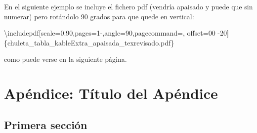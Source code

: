 \documentclass[12pt,a4paper,oneside,]{article}
\def\ifdoblecara{} %
\let\ifdoblecara\undefined %
\def\ifprincipal{} %
\newenvironment{Shaded}{\begin{snugshade}}{\end{snugshade}}
\newcommand{\FunctionTok}[1]{\textcolor[rgb]{0.00,0.00,0.00}{#1}}
\newcommand{\NormalTok}[1]{#1}
\numberwithin{dummy}{section}
\theoremstyle{ocrenumbox}
\theoremstyle{blacknumex}
\theoremstyle{blacknumbox}
\theoremstyle{ocrenum}
\theoremstyle{ocrenum}
\begin{document}
En el siguiente ejemplo se incluye el fichero pdf (vendría apaisado y
puede que sin numerar) pero rotándolo 90 grados para que quede en
vertical:

\begin{Shaded}
\begin{Highlighting}[]
\FunctionTok{\textbackslash{}includepdf}\NormalTok{[scale=0.90,pages=1{-},angle=90,pagecommand=,}
\NormalTok{offset=00 {-}20]\{chuleta\_tabla\_kableExtra\_apaisada\_texrevisado.pdf\}}
\end{Highlighting}
\end{Shaded}

como puede verse en la siguiente página.



\FloatBarrier

\appendix

\ifdefined\ifprincipal
\else
\setlength{\parindent}{1em}
\pagestyle{fancy}
\setcounter{tocdepth}{4}
\tableofcontents

\nocite{Luque2017,Luque2019,RStudio,R-base2,
R-knitr,R-rmarkdown,R-dplyr,R-ggplot2,Techopedia}

\fi

\ifdefined\ifdoblecara
\fancyhead{}{}
\fancyhead[LE,RO]{\scriptsize\rightmark}
\fancyfoot[LO,RE]{\scriptsize\slshape \leftmark}
\fancyfoot[C]{}
\fancyfoot[LE,RO]{\footnotesize\thepage}
\else
\fancyhead{}{}
\fancyhead[RO]{\scriptsize\rightmark}
\fancyfoot[LO]{\scriptsize\slshape \leftmark}
\fancyfoot[C]{}
\fancyfoot[RO]{\footnotesize\thepage}
\fi

\renewcommand{\headrulewidth}{0.4pt}
\renewcommand{\footrulewidth}{0.4pt}

\hypertarget{apuxe9ndice-tuxedtulo-del-apuxe9ndice}{%
\section{Apéndice: Título del
Apéndice}\label{apuxe9ndice-tuxedtulo-del-apuxe9ndice}}

\hypertarget{primera-secciuxf3n-4}{%
\subsection{Primera sección}\label{primera-secciuxf3n-4}}

\ifdefined\ifprincipal
\else
\setlength{\parindent}{1em}
\pagestyle{fancy}
\setcounter{tocdepth}{4}
\tableofcontents
\end{document}
